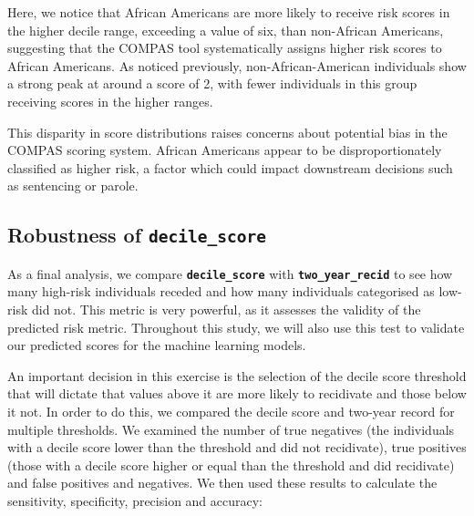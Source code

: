 Here, we notice that African Americans are more likely to receive risk scores in the higher decile range, exceeding a value of six, than non-African Americans, suggesting that the COMPAS tool systematically assigns higher risk scores to African Americans. As noticed previously, non-African-American individuals show a strong peak at around a score of 2, with fewer individuals in this group receiving scores in the higher ranges.

This disparity in score distributions raises concerns about potential bias in the COMPAS scoring system. African Americans appear to be disproportionately classified as higher risk, a factor which could impact downstream decisions such as sentencing or parole.

\subsection{Robustness of \textbf{\texttt{decile\_score}}}

As a final analysis, we compare \textbf{\texttt{decile\_score}} with \textbf{\texttt{two\_year\_recid}} to see how many high-risk individuals receded and how many individuals categorised as low-risk did not. This metric is very powerful, as it assesses the validity of the predicted risk metric. Throughout this study, we will also use this test to validate our predicted scores for the machine learning models.


An important decision in this exercise is the selection of the decile score threshold that will dictate that values above it are more likely to recidivate and those below it not. In order to do this, we compared the decile score and two-year record for multiple thresholds. We examined the number of true negatives (the individuals with a decile score lower than the threshold and did not recidivate), true positives (those with a decile score higher or equal than the threshold and did recidivate) and false positives and negatives. We then used these results to calculate the sensitivity, specificity, precision and accuracy:

